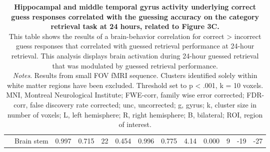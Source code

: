 \begin{landscape}
\begin{table}[!ht]
\begin{tabular}{ll|cccc|cccc|ccc}
        \textbf{} & Brain stem & 0.997 & 0.715 & 22 & 0.454 & 0.996 & 0.775 & 4.14 & 0.000 & 9 & -19 & -27 \\
    \end{tabular}
    \vspace{1.0 em}
    \caption{\textbf{Hippocampal and middle temporal gyrus activity underlying correct guess responses correlated with the guessing accuracy on the category retrieval task at 24 hours, related to Figure 3C.} \\ 
    This table shows the results of a brain-behavior correlation for correct > incorrect guess responses that correlated with guessed retrieval performance at 24-hour retrieval.
    This analysis displays brain activation during 24-hour guessed retrieval that was modulated by guessed retrieval performance. \\
    \vspace{1.0 em} \textit{Notes}. Results from small FOV fMRI sequence. Clusters identified solely within white matter regions have been excluded. Threshold set to p < .001, k = 10 voxels. MNI, Montreal Neurological Institute; FWE-corr, family wise error corrected; FDR-corr, false discovery rate corrected; unc, uncorrected; g, gyrus; k, cluster size in number of voxels; L, left hemisphere; R, right hemisphere; B, bilateral; ROI, region of interest.}
    \label{tab:unconsciousCORR_Day2}
\end{table}
\end{landscape}